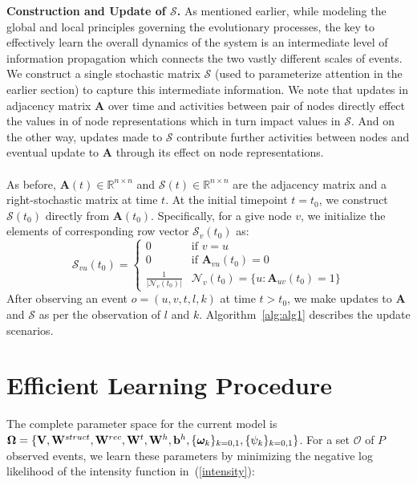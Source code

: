 \documentclass[11pt]{article}
\begin{document}
{\bf Construction and Update of $\mathcal{S}$.} As mentioned earlier, while modeling the global and local principles governing the evolutionary processes, the key to effectively learn the overall dynamics of the system is an intermediate level of information propagation which connects the two vastly different scales of events. We construct a single stochastic matrix $\mathcal{S}$ (used to parameterize attention in the earlier section) to capture this intermediate information. We note that updates in adjacency matrix $\mathbf{A}$ over time and activities between pair of nodes directly effect the values in of node representations which in turn impact values in $\mathcal{S}$. And on the other way, updates made to $\mathcal{S}$ contribute further activities between nodes and eventual update to $\mathbf{A}$ through its effect on node representations.\\\\
As before, $\mathbf{A}(t) \in \mathbb{R}^{n \times n}$ and $\mathcal{S}(t) \in \mathbb{R}^{n \times n}$ are the adjacency matrix and a right-stochastic matrix at time $t$. At the initial timepoint $t = t_0$, we construct $\mathcal{S}(t_0)$ directly from $\mathbf{A}(t_0)$. Specifically, for a give node $v$, we initialize the elements of corresponding row vector $\mathbf{\mathcal{S}}_v(t_0)$ as:
\begin{equation}
\mathcal{S}_{vu}(t_0) = \begin{cases}
0 &\text{if $v=u$}\\
0 &\text{if $\mathbf{A}_{vu}(t_0) = 0$}\\
\frac{1}{|\mathcal{N}_v(t_0)|} &\text{$\mathcal{N}_v(t_0)= \{u: \mathbf{A}_{uv}(t_0) = 1\}$}
\end{cases}
\end{equation}
After observing an event $o = (u, v, t, l, k)$ at time $t > t_0$, we make updates to $\mathbf{A}$ and $\mathcal{S}$ as per the observation of $l$ and $k$. Algorithm~\ref{alg:alg1} describes the update scenarios.


\section{Efficient Learning Procedure}
\vspace{-2mm}

The complete parameter space for the current model is $\mathbf{\Omega} = \{\mathbf{V},\mathbf{W}^{struct},\mathbf{W}^{rec},\mathbf{W}^t,\mathbf{W}^{h}, \mathbf{b}^{h},\\ \{\bm{\omega}_k\}_{k=0,1},\{\psi_k\}_{k=0,1}\}$. For a set $\mathcal{O}$ of $P$ observed events, 
we learn these parameters by minimizing the negative log likelihood of the intensity function in~(\ref{intensity}):
\end{document}
